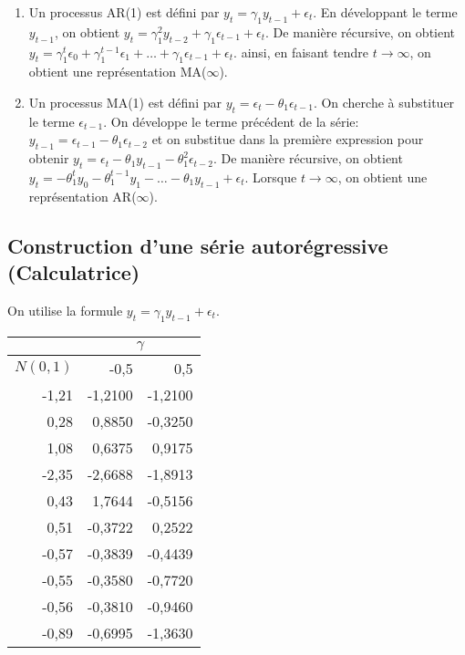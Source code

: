 \documentclass{article}
\begin{document}
\begin{enumerate}
\item Un processus AR(1) est défini par $y_t = \gamma_1y_{t-1} + \epsilon_t$. En développant le terme $y_{t-1}$, on obtient $y_t = \gamma_1^2y_{t-2}+\gamma_1\epsilon_{t-1}+\epsilon_t$. De manière récursive, on obtient $y_t = \gamma_1^{t}\epsilon_0 + \gamma_1^{t-1}\epsilon_1 + \ldots + \gamma_1\epsilon_{t-1} + \epsilon_t$. ainsi, en faisant tendre $t\to\infty$, on obtient une représentation MA($\infty$).

\item Un processus MA(1) est défini par $y_t = \epsilon_t - \theta_1\epsilon_{t-1}$. On cherche à substituer le terme $\epsilon_{t-1}$. On développe le terme précédent de la série: $y_{t-1} = \epsilon_{t-1} - \theta_1\epsilon_{t-2}$ et on substitue dans la première expression pour obtenir $y_t = \epsilon_t - \theta_1y_{t-1} - \theta_1^2\epsilon_{t-2}$. De manière récursive, on obtient $y_t = -\theta_1^ty_0-\theta_1^{t-1}y_1-\ldots-\theta_1y_{t-1}+\epsilon_{t}$. Lorsque $t\to\infty$, on obtient une représentation AR($\infty$).
\end{enumerate}


\clearpage
\subsection{Construction d'une série autorégressive (Calculatrice)}

On utilise la formule $y_t = \gamma_1y_{t-1} + \epsilon_t$.

\begin{center}
\begin{tabular}{|r|r|r|}
\hline
\multicolumn{1}{|l|}{} & \multicolumn{ 2}{c|}{$\gamma$} \\ \hline
\multicolumn{1}{|l|}{$N(0,1)$} & -0,5 & 0,5 \\ \hline
-1,21 & -1,2100 & -1,2100 \\ \hline
0,28 & 0,8850 & -0,3250 \\ \hline
1,08 & 0,6375 & 0,9175 \\ \hline
-2,35 & -2,6688 & -1,8913 \\ \hline
0,43 & 1,7644 & -0,5156 \\ \hline
0,51 & -0,3722 & 0,2522 \\ \hline
-0,57 & -0,3839 & -0,4439 \\ \hline
-0,55 & -0,3580 & -0,7720 \\ \hline
-0,56 & -0,3810 & -0,9460 \\ \hline
-0,89 & -0,6995 & -1,3630 \\ \hline
\end{tabular}
\end{center}
\end{document}
